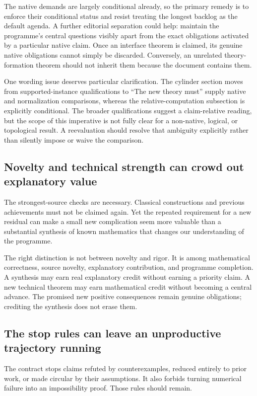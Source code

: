 \documentclass[11pt]{article}
\begin{document}
The native demands are largely conditional already, so the primary remedy is to enforce their conditional status and resist treating the longest backlog as the default agenda. A further editorial separation could help: maintain the programme's central questions visibly apart from the exact obligations activated by a particular native claim. Once an interface theorem is claimed, its genuine native obligations cannot simply be discarded. Conversely, an unrelated theory-formation theorem should not inherit them because the document contains them.

One wording issue deserves particular clarification. The cylinder section moves from supported-instance qualifications to ``The new theory must'' supply native and normalization comparisons, whereas the relative-computation subsection is explicitly conditional. The broader qualifications suggest a claim-relative reading, but the scope of this imperative is not fully clear for a non-native, logical, or topological result. A reevaluation should resolve that ambiguity explicitly rather than silently impose or waive the comparison.

\subsection{Novelty and technical strength can crowd out explanatory value}

The strongest-source checks are necessary. Classical constructions and previous achievements must not be claimed again. Yet the repeated requirement for a new residual can make a small new complication seem more valuable than a substantial synthesis of known mathematics that changes our understanding of the programme.

The right distinction is not between novelty and rigor. It is among mathematical correctness, source novelty, explanatory contribution, and programme completion. A synthesis may earn real explanatory credit without earning a priority claim. A new technical theorem may earn mathematical credit without becoming a central advance. The promised new positive consequences remain genuine obligations; crediting the synthesis does not erase them.

\subsection{The stop rules can leave an unproductive trajectory running}

The contract stops claims refuted by counterexamples, reduced entirely to prior work, or made circular by their assumptions. It also forbids turning numerical failure into an impossibility proof. Those rules should remain.
\end{document}
